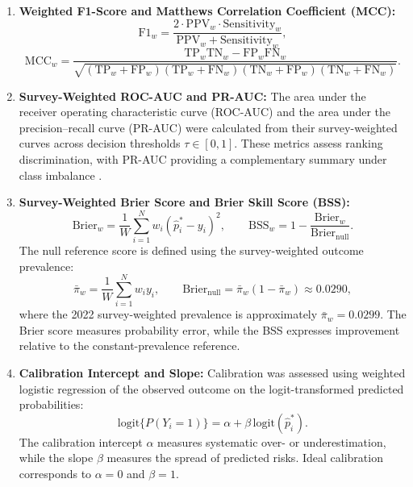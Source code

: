 \documentclass[a4paper,fleqn]{cas-sc}
\begin{document}
\begin{enumerate}
    \item \textbf{Weighted F1-Score and Matthews Correlation Coefficient (MCC):}
    \begin{equation}
      \mathrm{F1}_w =
      \frac{2\cdot\mathrm{PPV}_w\cdot\mathrm{Sensitivity}_w}
      {\mathrm{PPV}_w+\mathrm{Sensitivity}_w},
    \end{equation}
    \begin{equation}
      \mathrm{MCC}_w =
      \frac{
      \mathrm{TP}_w\mathrm{TN}_w-\mathrm{FP}_w\mathrm{FN}_w
      }{
      \sqrt{
      (\mathrm{TP}_w+\mathrm{FP}_w)
      (\mathrm{TP}_w+\mathrm{FN}_w)
      (\mathrm{TN}_w+\mathrm{FP}_w)
      (\mathrm{TN}_w+\mathrm{FN}_w)
      }}.
    \end{equation}

    \item \textbf{Survey-Weighted ROC-AUC and PR-AUC:}
    The area under the receiver operating characteristic curve (ROC-AUC) and the area under the precision--recall curve (PR-AUC) were calculated from their survey-weighted curves across decision thresholds $\tau\in[0,1]$. These metrics assess ranking discrimination, with PR-AUC providing a complementary summary under class imbalance \cite{saito2015}.

    \item \textbf{Survey-Weighted Brier Score and Brier Skill Score (BSS):}
    \begin{equation}
      \mathrm{Brier}_w =
      \frac{1}{W}\sum_{i=1}^{N}w_i(\hat{p}_i^*-y_i)^2,
      \qquad
      \mathrm{BSS}_w =
      1-\frac{\mathrm{Brier}_w}{\mathrm{Brier}_{\mathrm{null}}}.
    \end{equation}
    The null reference score is defined using the survey-weighted outcome prevalence:
    \begin{equation}
      \bar{\pi}_w =
      \frac{1}{W}\sum_{i=1}^{N}w_i y_i,
      \qquad
      \mathrm{Brier}_{\mathrm{null}} =
      \bar{\pi}_w(1-\bar{\pi}_w)
      \approx 0.0290,
    \end{equation}
    where the 2022 survey-weighted prevalence is approximately $\bar{\pi}_w=0.0299$. The Brier score measures probability error, while the BSS expresses improvement relative to the constant-prevalence reference.

    \item \textbf{Calibration Intercept and Slope:}
    Calibration was assessed using weighted logistic regression of the observed outcome on the logit-transformed predicted probabilities:
    \begin{equation}
      \mathrm{logit}\{P(Y_i=1)\}
      =
      \alpha+\beta\,
      \mathrm{logit}(\hat{p}_i^*).
    \end{equation}
    The calibration intercept $\alpha$ measures systematic over- or underestimation, while the slope $\beta$ measures the spread of predicted risks. Ideal calibration corresponds to $\alpha=0$ and $\beta=1$.


\end{enumerate}
\end{document}
